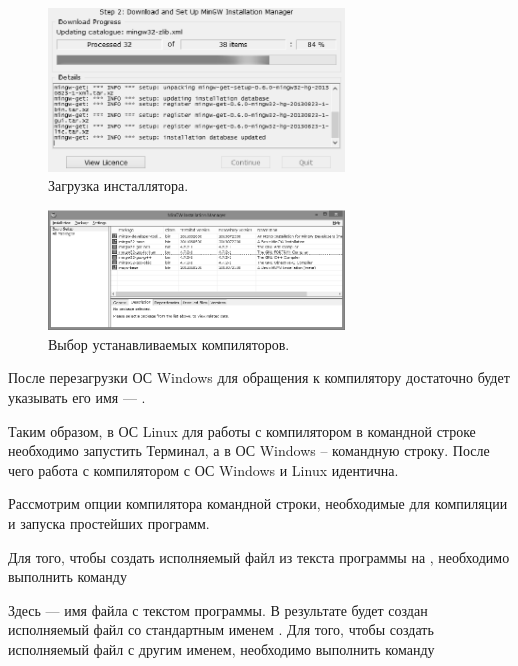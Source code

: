 \begin{figure}[htb]
\begin{center}
\includegraphics[width=0.7\textwidth]{img/ris_app_4}
\caption[Загрузка инсталлятора.]{Загрузка инсталлятора.}
\label{app:refDrawing3}
\end{center}
\end{figure}


\begin{figure}[htb]
\begin{center}
\includegraphics[width=0.7\textwidth]{img/ris_app_5}
\caption[Выбор устанавливаемых компиляторов.]{Выбор устанавливаемых компиляторов.}
\label{app:refDrawing4}
\end{center}
\end{figure}

После перезагрузки ОС Windows для обращения к компилятору достаточно будет указывать его имя --- .

Таким образом, в ОС Linux для работы с компилятором в командной строке необходимо запустить Терминал, а в ОС Windows –
командную строку. После чего работа с компилятором  с ОС Windows и Linux идентична.

Рассмотрим опции компилятора командной строки, необходимые для компиляции и запуска простейших программ. 

Для того, чтобы создать исполняемый файл из текста программы на , необходимо выполнить команду 


Здесь  --- имя файла с текстом программы. В результате будет создан исполняемый файл со стандартным
именем . Для того, чтобы создать исполняемый файл с другим именем, необходимо выполнить команду 

